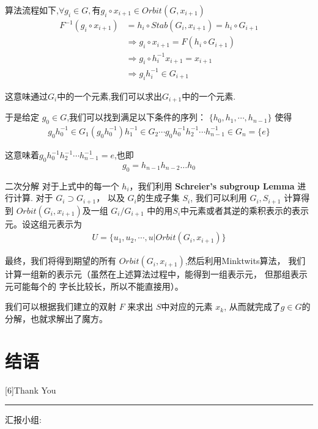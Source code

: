 \documentclass{beamer}
\begin{document}
\begin{frame}
    算法流程如下,$\forall g_i \in  G , \mbox{有} g_i\circ x_{i+1} \in Orbit(G, x_{i+1})$
\begin{align*}
	F^{-1}(g_i\circ x_{i+1}) 
	& = h_i \circ Stab(G_i, x_{i+1}) = h_i\circ G_{i+1}\\
	& \Longrightarrow g_i\circ x_{i+1} = F(h_i\circ G_{i+1}) \\
	& \Longrightarrow g_i \circ h_i^{-1}x_{i+1} = x_{i+1} \\
	& \Longrightarrow g_i h_i^{-1} \in G_{i+1}
\end{align*}

这意味通过$G_i$中的一个元素,我们可以求出$G_{i+1}$中的一个元素.
\end{frame} 

\begin{frame}
    于是给定 $g_0\in G$,我们可以找到满足以下条件的序列：
    $\{h_0, h_1,\cdots,h_{n-1}\}$ 使得
\begin{align}
	g_0h_0^{-1} \in G_1(g_0h_0^{-1}) h_1^{-1} 
	\in G_2\cdots g_0 h_0^{-1}h_2^{-1}\cdots h_{n-1}^{-1}
	\in G_n = \{e\}
\end{align}

这意味着$g_0 h_0^{-1}h_2^{-1}\cdots h_{n-1}^{-1} = e$,也即
\[
	g_0 = h_{n-1}h_{n-2}\ldots h_0
\]
\end{frame} 

\begin{frame}{二次分解}
    对于上式中的每一个 $h_i$，我们利用 {\bf Schreier's subgroup Lemma} 进行计算.
对于 $G_i\supset G_{i+1}$， 以及 $G_i$的生成子集 $S_i$, 我们可以利用
$G_i,S_{i+1}$ 计算得到 $Orbit(G_{i}, x_{i+1})$及一组 $G_i\big/G_{i+1}$
中的用$S_i$中元素或者其逆的乘积表示的表示元。设这组元表示为
\begin{align}
    U = \{u_1,u_2,\cdots, u\big|Orbit(G_i, x_{i+1})\}
\end{align}
\end{frame} 

\begin{frame}
    最终，我们将得到期望的所有 $Orbit(G_i, x_{i+1})$,然后利用Minktwits算法，
我们计算一组新的表示元（虽然在上述算法过程中，能得到一组表示元，
但那组表示元可能每个的 字长比较长，所以不能直接用）。

我们可以根据我们建立的双射 $F$ 来求出 $S$中对应的元素 $x_k$,
从而就完成了$g\in G$的分解，也就求解出了魔方。
\end{frame} 




\newcommand{\scale}[2]{%
    \scalebox{#1}[#1]{#2}}
\section{结语}
\begin{frame}[plain]
    \centering
    \scale{6}{Thank You}

    \vspace*{7em}
    \noindent\rule{.9\linewidth}{2pt}

    汇报小组:
\end{frame} 
\end{document}
